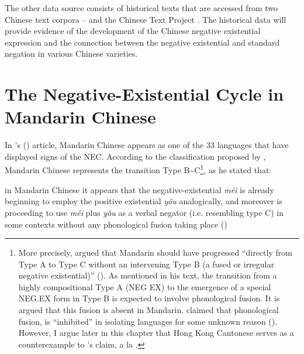 \documentclass[output=paper]{langscibook}
\begin{document}
The other data source consists of historical texts that are accessed from two Chinese text corpora -- \cite{chant} and the Chinese Text Project \citep{Sturgeon2011}. The historical data will provide evidence of the development of the Chinese negative existential expression and the connection between the negative existential and standard negation in various Chinese varieties.


\section{The Negative-Existential Cycle in Mandarin Chinese}\label{s:lam3}

In \citeauthor{Croft1991}'s (\citeyear{Croft1991}) article, Mandarin Chinese appears as one of the 33 languages that have displayed signs of the NEC. According to the classification proposed by \citeauthor{Croft1991}, Mandarin Chinese represents the transition Type B\sim C\footnote{More precisely, \citeauthor{Croft1991} argued that Mandarin should have progressed ``directly from Type A to Type C without an intervening Type B (a fused or irregular negative existential)'' (\citeyear[23]{Croft1991}). As mentioned in his text, the transition from a highly compositional Type A (NEG EX) to the emergence of a special NEG.EX form in Type B is expected to involve phonological fusion. It is argued that this fusion is absent in Mandarin. \citeauthor{Croft1991} claimed that phonological fusion, is ``inhibited'' in isolating languages for some unknown reason (\citeyear[23]{Croft1991}). However, I argue later in this chapter that Hong Kong Cantonese serves as a counterexample to \citeauthor{Croft1991}'s claim, a la \cite{Law2014}.}, as he stated that:

\begin{displayquote}
in Mandarin Chinese it appears that the negative-existential \textit{méi} is already beginning to employ the positive existential \textit{yǒu} analogically, and moreover is proceeding to use \textit{méi} plus \textit{yǒu} as a verbal negator (i.e. resembling type C) in some contexts without any phonological fusion taking place (\citealt[23]{Croft1991})
\end{displayquote}
\end{document}
